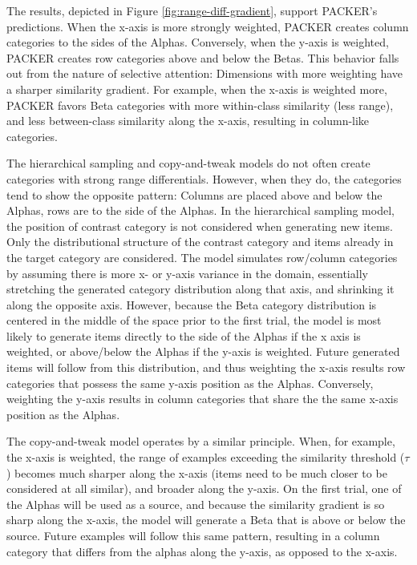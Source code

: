 \documentclass[10pt,letterpaper]{article}
\begin{document}
The results, depicted in Figure \ref{fig:range-diff-gradient}, support PACKER's predictions. When the x-axis is more strongly weighted, PACKER creates column categories to the sides of the Alphas. Conversely, when the y-axis is weighted, PACKER creates row categories above and below the Betas. This behavior falls out from the nature of selective attention: Dimensions with more weighting have a sharper similarity gradient. For example, when the x-axis is weighted more, PACKER favors Beta categories with more within-class similarity (less range), and less between-class similarity along the x-axis, resulting in column-like categories.

The hierarchical sampling and copy-and-tweak models do not often create categories with strong range differentials. However, when they do, the categories tend to show the opposite pattern: Columns are placed above and below the Alphas, rows are to the side of the Alphas. In the hierarchical sampling model, the position of contrast category is not considered when generating new items. Only the distributional structure of the contrast category and items already in the target category are considered. The model simulates row/column categories by assuming there is more x- or y-axis variance in the domain, essentially stretching the generated category distribution along that axis, and shrinking it along the opposite axis. However, because the Beta category distribution is centered in the middle of the space prior to the first trial, the model is most likely to generate items directly to the side of the Alphas if the x axis is weighted, or above/below the Alphas if the y-axis is weighted. Future generated items will follow from this distribution, and thus weighting the x-axis results row categories that possess the same y-axis position as the Alphas. Conversely, weighting the y-axis results in column categories that share the the same x-axis position as the Alphas.

The copy-and-tweak model operates by a similar principle. When, for example, the x-axis is weighted, the range of examples exceeding the similarity threshold ($\tau$) becomes much sharper along the x-axis (items need to be much closer to be considered at all similar), and broader along the y-axis. On the first trial, one of the Alphas will be used as a source, and because the similarity gradient is so sharp along the x-axis, the model will generate a Beta that is above or below the source. Future examples will follow this same pattern, resulting in a column category that differs from the alphas along the y-axis, as opposed to the x-axis.
\end{document}

